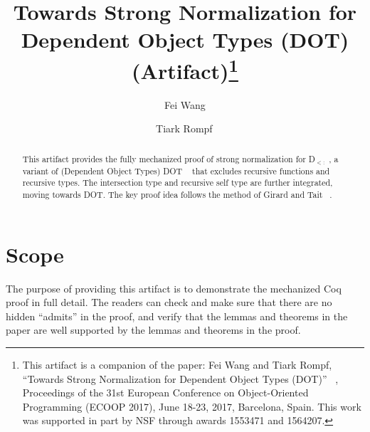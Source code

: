 \documentclass[a4paper,UKenglish]{darts}
\title{Towards Strong Normalization for Dependent Object Types (DOT) (Artifact)\footnote{This artifact is a companion of the paper:  Fei Wang and Tiark Rompf, ``Towards Strong Normalization for Dependent Object Types (DOT)'' ~\cite{DBLP:conf/ecoop/Wang}, Proceedings of the 31st European Conference on Object-Oriented Programming (ECOOP 2017), June 18-23, 2017, Barcelona, Spain. This work was supported in part by NSF through awards 1553471 and 1564207.}}
\author[1]{Fei Wang}
\author[2]{Tiark Rompf\,}
\affil[1]{Purdue University, USA\\
  \texttt{wang603@purdue.edu}}
\affil[2]{Purdue University, USA\\
  \texttt{tiark@purdue.edu}}
\newenvironment{scope}{\section{Scope}}{}
\begin{document}
\maketitle

\begin{abstract}
This artifact provides the fully mechanized proof of strong normalization for D$_{<:}$ , a variant of (Dependent Object Types) DOT ~\cite{DBLP:conf/oopsla/RompfA16} that 
excludes recursive functions and recursive types. The intersection type and recursive self type are further integrated, moving towards DOT. The key proof idea follows the method of Girard and Tait ~\cite{girard1972interpretation, DBLP:journals/jsyml/Tait67}.
\end{abstract}


\begin{scope}
  The purpose of providing this artifact is to demonstrate the mechanized Coq ~\cite{coq} proof in full detail. The readers can check and make sure that there are no hidden ``admits'' in the proof, and verify that the lemmas and theorems in the paper are well supported by the lemmas and theorems in the proof.
\end{scope}
\end{document}
